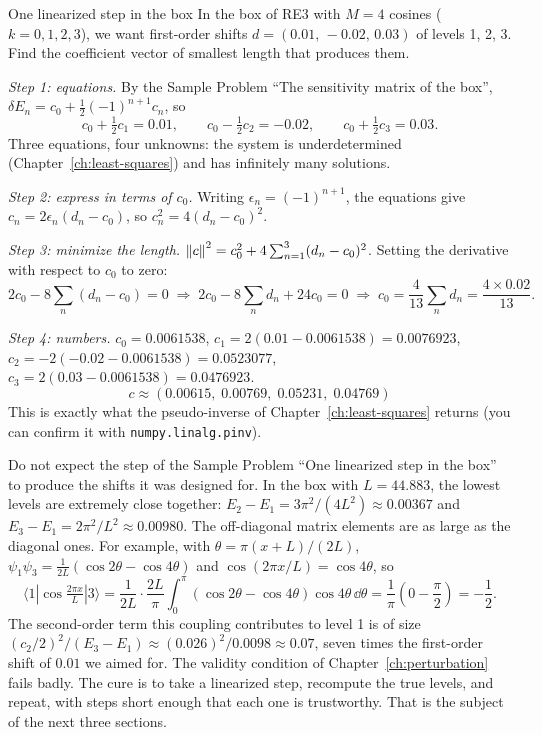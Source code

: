 \begin{sample}{One linearized step in the box}
In the box of RE3 with $M=4$ cosines ($k=0,1,2,3$), we want first-order shifts $d=(0.01,\,-0.02,\,0.03)$ of levels 1, 2, 3. Find the coefficient vector of smallest length that produces them.

\emph{Step 1: equations.} By the Sample Problem ``The sensitivity matrix of the box'', $\delta E_n=c_0+\tfrac12(-1)^{n+1}c_n$, so
\[
c_0+\tfrac12c_1=0.01,\qquad c_0-\tfrac12c_2=-0.02,\qquad c_0+\tfrac12c_3=0.03 .
\]
Three equations, four unknowns: the system is underdetermined (Chapter~\ref{ch:least-squares}) and has infinitely many solutions.

\emph{Step 2: express in terms of $c_0$.} Writing $\epsilon_n=(-1)^{n+1}$, the equations give $c_n=2\epsilon_n(d_n-c_0)$, so $c_n^2=4(d_n-c_0)^2$.

\emph{Step 3: minimize the length.} $\left\lVert c\right\rVert^2=c_0^2+4\sum_{n=1}^3(d_n-c_0)^2$. Setting the derivative with respect to $c_0$ to zero:
\[
2c_0-8\sum_n(d_n-c_0)=0\;\Rightarrow\;2c_0-8\sum_nd_n+24c_0=0\;\Rightarrow\;c_0=\frac{4}{13}\sum_nd_n=\frac{4\times0.02}{13}.
\]

\emph{Step 4: numbers.} $c_0=0.0061538$, $c_1=2(0.01-0.0061538)=0.0076923$, $c_2=-2(-0.02-0.0061538)=0.0523077$, $c_3=2(0.03-0.0061538)=0.0476923$.
\[
\boxed{c\approx(0.00615,\;0.00769,\;0.05231,\;0.04769)}
\]
This is exactly what the pseudo-inverse of Chapter~\ref{ch:least-squares} returns (you can confirm it with \texttt{numpy.linalg.pinv}).
\end{sample}

\begin{pitfall}
Do not expect the step of the Sample Problem ``One linearized step in the box'' to produce the shifts it was designed for. In the box with $L=44.883$, the lowest levels are extremely close together: $E_2-E_1=3\pi^2/(4L^2)\approx0.00367$ and $E_3-E_1=2\pi^2/L^2\approx0.00980$. The off-diagonal matrix elements are as large as the diagonal ones. For example, with $\theta=\pi(x+L)/(2L)$, $\psi_1\psi_3=\frac{1}{2L}(\cos2\theta-\cos4\theta)$ and $\cos(2\pi x/L)=\cos4\theta$, so
\[
\langle1|\cos\tfrac{2\pi x}{L}|3\rangle=\frac{1}{2L}\cdot\frac{2L}{\pi}\int_0^\pi(\cos2\theta-\cos4\theta)\cos4\theta\,\dd\theta=\frac{1}{\pi}\left(0-\frac{\pi}{2}\right)=-\frac12 .
\]
The second-order term this coupling contributes to level 1 is of size $(c_2/2)^2/(E_3-E_1)\approx(0.026)^2/0.0098\approx0.07$, seven times the first-order shift of $0.01$ we aimed for. The validity condition of Chapter~\ref{ch:perturbation} fails badly. The cure is to take a linearized step, recompute the true levels, and repeat, with steps short enough that each one is trustworthy. That is the subject of the next three sections.
\end{pitfall}


